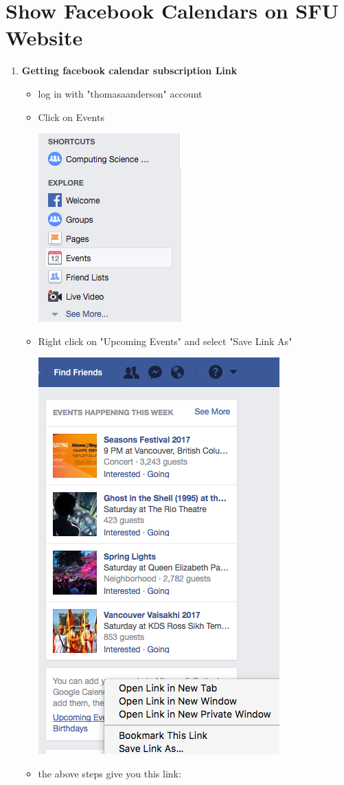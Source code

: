 \documentclass{article}
\begin{document}
\section*{Show Facebook Calendars on SFU Website}

\begin{enumerate}
	\item \textbf{Getting facebook calendar subscription Link}
	\begin{itemize}
		\item log in with "thomasaanderson" account
		\item Click on Events
		
		\includegraphics[scale=0.45]{picture1.png}
		\item Right click on "Upcoming Events" and select "Save Link As"
		
		\includegraphics[scale=0.45]{picture2.png}
		\item the above steps give you this link: 
		

\end{itemize}
\end{enumerate}
\end{document}
